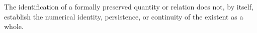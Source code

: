 \begin{table}[htbp]
\begin{minipage}{0.95\textwidth}
        The identification of a formally preserved quantity or
        relation does not, by itself, establish the numerical identity,
        persistence, or continuity of the existent as a whole.
    \end{minipage}

\end{table}
